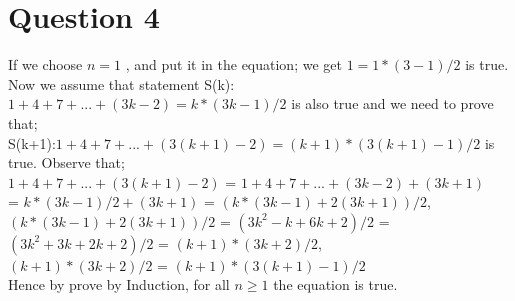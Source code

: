 \documentclass[12pt]{article}
\begin{document}
\section*{Question 4}
If we choose $n=1$ , and put it in the equation; we get $1= 1*(3-1)/2$ is true.\\
Now we assume that statement S(k):$1+4+7+...+(3k-2)=k*(3k-1)/2$ is also true and we need to prove that; \\
S(k+1):$1+4+7+...+(3(k+1)-2)=(k+1)*(3(k+1)-1)/2$ is true. Observe that; \\
$1+4+7+...+(3(k+1)-2)$ = $1+4+7+...+(3k-2)+(3k+1)$ \\
= $k*(3k-1)/2 + (3k+1)$ = $(k*(3k-1) + 2(3k+1))/2$, \\
$(k*(3k-1) + 2(3k+1))/2$ = $(3k^2-k+6k+2)/2$ = $(3k^2+3k+2k+2)/2$ = $(k+1)*(3k+2)/2$, \\
$(k+1)*(3k+2)/2$ = $(k+1)*(3(k+1)-1)/2$\\ 
Hence by prove by Induction, for all $n\geq1$ the equation is true. \\
\end{document}
